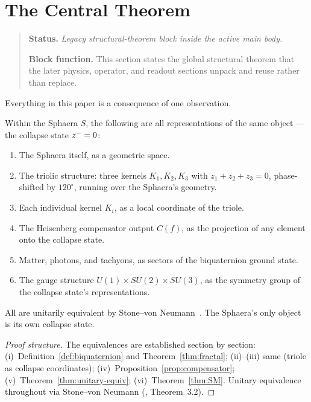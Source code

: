 \section{The Central Theorem}
\begin{quote}\small
\noindent\textbf{Status.} \emph{Legacy structural-theorem block inside the active main body.}\par
\noindent\textbf{Block function.} This section states the global structural theorem that the later physics, operator, and readout sections unpack and reuse rather than replace.
\end{quote}
\label{sec:central}

Everything in this paper is a consequence of one observation.

\begin{theorem}\label{thm:unity}
Within the Sphaera $S$, the following are all representations of the
same object --- the collapse state $z^-=0$:
\begin{enumerate}[label=(\roman*)]
  \item The Sphaera itself, as a geometric space.
  \item The triolic structure: three kernels $K_1,K_2,K_3$ with
        $z_1+z_2+z_3=0$, phase-shifted by $120^\circ$, running over the
        Sphaera's geometry.
  \item Each individual kernel $K_i$, as a local coordinate of the triole.
  \item The Heisenberg compensator output $C(f)$, as the projection of
        any element onto the collapse state.
  \item Matter, photons, and tachyons, as sectors of the biquaternion
        ground state.
  \item The gauge structure $U(1)\times SU(2)\times SU(3)$, as the
        symmetry group of the collapse state's representations.
\end{enumerate}
All are unitarily equivalent by Stone--von Neumann~\cite{brendecke2026rh}.
The Sphaera's only object is its own collapse state.
\end{theorem}

\begin{proof}[Proof structure]
The equivalences are established section by section:
(i)~Definition~\ref{def:biquaternion} and Theorem~\ref{thm:fractal};
(ii)--(iii) same (triole as collapse coordinates);
(iv)~Proposition~\ref{prop:compensator};
(v)~Theorem~\ref{thm:unitary-equiv};
(vi)~Theorem~\ref{thm:SM}.
Unitary equivalence throughout via Stone--von Neumann
(\cite{brendecke2026rh}, Theorem~3.2).
\end{proof}


